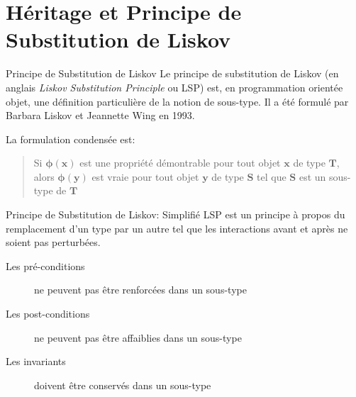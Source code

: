 \documentclass[10pt]{beamer}
\begin{document}
\section{Héritage et Principe de Substitution de Liskov}
\begin{frame}{Principe de Substitution de Liskov}
    Le principe de substitution de Liskov (en anglais \emph{Liskov Substitution Principle} ou \alert{LSP}) est, en programmation orientée objet, une définition particulière de la notion de sous-type. Il a été formulé par Barbara Liskov et Jeannette Wing en 1993. \cite{liskov_behavioral_1994}
    
    La formulation condensée est:
    \begin{quote}
        Si $\mathbf{\phi(x)}$ est une propriété démontrable pour tout objet $\mathbf{x}$ de type $\mathbf{T}$, alors $\mathbf{\phi(y)}$ est vraie pour tout objet $\mathbf{y}$ de type $\mathbf{S}$ tel que $\mathbf{S}$ est un sous-type de $\mathbf{T}$
        
    \end{quote}
\end{frame}
\begin{frame}{Principe de Substitution de Liskov: Simplifié}
    LSP est un principe à propos du remplacement d'un type par un autre tel que les interactions avant et après ne soient pas perturbées.

    \begin{description}
        \item[Les pré-conditions] ne peuvent pas être renforcées dans un sous-type
        \item[Les post-conditions] ne peuvent pas être affaiblies dans un sous-type
        \item[Les invariants] doivent être conservés dans un sous-type
    \end{description}
\end{frame}
\end{document}
